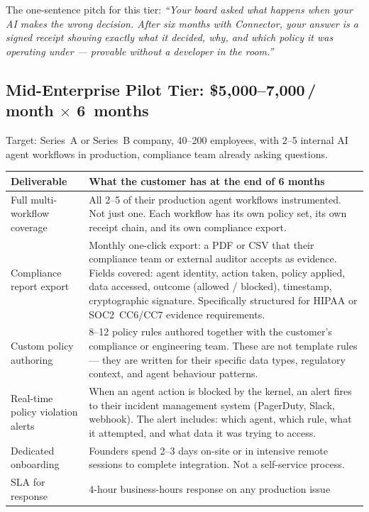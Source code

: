\noindent The one-sentence pitch for this tier: \emph{``Your board asked
what happens when your AI makes the wrong decision. After six months with
Connector, your answer is a signed receipt showing exactly what it decided,
why, and which policy it was operating under --- provable without a developer
in the room.''}

\subsection*{Mid-Enterprise Pilot Tier: \$5,000--7,000\,/\,month $\times$ 6~months}

Target: Series~A or Series~B company, 40--200 employees, with 2--5 internal
AI agent workflows in production, compliance team already asking questions.

\begin{table}[H]
\centering
\renewcommand{\arraystretch}{1.55}
\begin{tabularx}{\textwidth}{@{}lX@{}}
\toprule
\textbf{Deliverable} & \textbf{What the customer has at the end of 6 months} \\
\midrule
Full multi-workflow coverage & All 2--5 of their production agent workflows
  instrumented. Not just one. Each workflow has its own policy set, its
  own receipt chain, and its own compliance export. \\
Compliance report export & Monthly one-click export: a PDF or CSV that
  their compliance team or external auditor accepts as evidence. Fields
  covered: agent identity, action taken, policy applied, data accessed,
  outcome (allowed / blocked), timestamp, cryptographic signature.
  Specifically structured for HIPAA or SOC2~CC6/CC7 evidence requirements. \\
Custom policy authoring & 8--12 policy rules authored together with the
  customer's compliance or engineering team. These are not template rules ---
  they are written for their specific data types, regulatory context, and
  agent behaviour patterns. \\
Real-time policy violation alerts & When an agent action is blocked by the
  kernel, an alert fires to their incident management system (PagerDuty,
  Slack, webhook). The alert includes: which agent, which rule, what it
  attempted, and what data it was trying to access. \\
Dedicated onboarding & Founders spend 2--3 days on-site or in intensive
  remote sessions to complete integration. Not a self-service process. \\
SLA for response & 4-hour business-hours response on any production issue

\end{tabularx}
\end{table}
